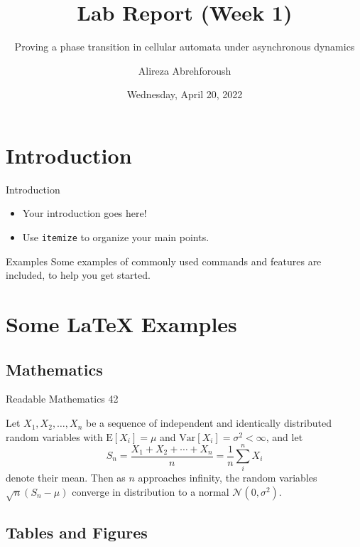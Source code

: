 \documentclass[10pt,xcolor={table,dvipsnames},t]{beamer}
\title[Your Short Title]{Lab Report (Week 1)}
\subtitle{Proving a phase transition in cellular automata under
asynchronous dynamics}
\author{Alireza Abrehforoush}
\institute{Isfahan University of Technology}
\date{Wednesday, April 20, 2022}
\begin{document}
\begin{frame}
  \titlepage
\end{frame}


\section{Introduction}

\begin{frame}{Introduction}

\begin{itemize}
  \item Your introduction goes here!
  \item Use \texttt{itemize} to organize your main points.
\end{itemize}

\begin{block}{Examples}
Some examples of commonly used commands and features are included, to help you get started.
\end{block}

\end{frame}

\section{Some \LaTeX{} Examples}

\subsection{Mathematics}

\begin{frame}{Readable Mathematics 42}

Let $X_1, X_2, \ldots, X_n$ be a sequence of independent and identically distributed random variables with $\text{E}[X_i] = \mu$ and $\text{Var}[X_i] = \sigma^2 < \infty$, and let
$$S_n = \frac{X_1 + X_2 + \cdots + X_n}{n}
      = \frac{1}{n}\sum_{i}^{n} X_i$$
denote their mean. Then as $n$ approaches infinity, the random variables $\sqrt{n}(S_n - \mu)$ converge in distribution to a normal $\mathcal{N}(0, \sigma^2)$.

\end{frame}


\subsection{Tables and Figures}
\end{document}

